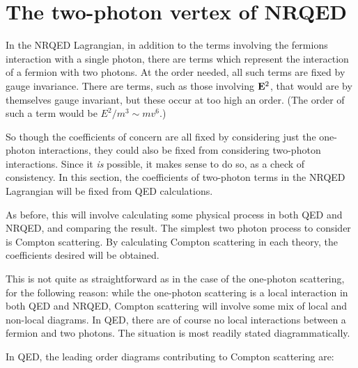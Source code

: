 \section{The two-photon vertex of NRQED}
In the NRQED Lagrangian, in addition to the terms involving the fermions interaction with a single photon, there are terms which represent the interaction of a fermion with two photons.  At the order needed, all such terms are fixed by gauge invariance.  There are terms, such as those involving $\mathbf{E}^2$, that would are by themselves gauge invariant, but these occur at too high an order.  (The order of such a term would be $E^2 / m^3 \sim mv^6$.)

So though the coefficients of concern are all fixed by considering just the one-photon interactions, they could also be fixed from considering two-photon interactions.  Since it {\it is} possible, it makes sense to do so, as a check of consistency.  In this section, the coefficients of two-photon terms in the NRQED Lagrangian will be fixed from QED calculations.

As before, this will involve calculating some physical process in both QED and NRQED, and comparing the result.  The simplest two photon process to consider is Compton scattering.  By calculating Compton scattering in each theory, the coefficients desired will be obtained.

This is not quite as straightforward as in the case of the one-photon scattering, for the following reason: while the one-photon scattering is a local interaction in both QED and NRQED, Compton scattering will involve some mix of local and non-local diagrams.  In QED, there are of course no local interactions between a fermion and two photons.  The situation is most readily stated diagrammatically.

In QED, the leading order diagrams contributing to Compton scattering are:

